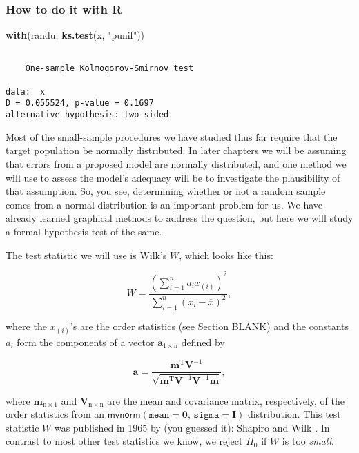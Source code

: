 \documentclass[]{book}
\newenvironment{Shaded}{\begin{snugshade}}{\end{snugshade}}
\newcommand{\KeywordTok}[1]{\textcolor[rgb]{0.13,0.29,0.53}{\textbf{{#1}}}}
\newcommand{\StringTok}[1]{\textcolor[rgb]{0.31,0.60,0.02}{{#1}}}
\newcommand{\NormalTok}[1]{{#1}}
\numberwithin{equation}{chapter}
\numberwithin{figure}{chapter}
\theoremstyle{plain}
\theoremstyle{definition}
\theoremstyle{remark}
\theoremstyle{definition}
\theoremstyle{definition}
\theoremstyle{remark}
\begin{document}
\subsubsection{How to do it with R}\label{how-to-do-it-with-r-43}

\begin{Shaded}
\begin{Highlighting}[]
\KeywordTok{with}\NormalTok{(randu, }\KeywordTok{ks.test}\NormalTok{(x, }\StringTok{"punif"}\NormalTok{))}
\end{Highlighting}
\end{Shaded}

\begin{verbatim}

    One-sample Kolmogorov-Smirnov test

data:  x
D = 0.055524, p-value = 0.1697
alternative hypothesis: two-sided
\end{verbatim}

Most of the small-sample procedures we have studied thus far require
that the target population be normally distributed. In later chapters we
will be assuming that errors from a proposed model are normally
distributed, and one method we will use to assess the model's adequacy
will be to investigate the plausibility of that assumption. So, you see,
determining whether or not a random sample comes from a normal
distribution is an important problem for us. We have already learned
graphical methods to address the question, but here we will study a
formal hypothesis test of the same.

The test statistic we will use is Wilk's \(W\), which looks like this:

\begin{equation}
W = \frac{\left(\sum_{i = 1}^{n} a_{i}x_{(i)} \right)^{2}}{\sum_{i = 1}^{n}(x_{i} - \overline{x})^{2}},
\end{equation}

where the \(x_{(i)}\)'s are the order statistics (see Section BLANK) and
the constants \(a_{i}\) form the components of a vector
\(\mathbf{a}_{1\times\mathrm{n}}\) defined by

\begin{equation}
\mathbf{a}=\frac{\mathbf{m}^{\mathrm{T}}\mathbf{V}^{-1}}{\sqrt{\mathbf{m}^{\mathrm{T}}\mathbf{V}^{-1}\mathbf{V}^{-1}\mathbf{m}}},
\end{equation}

where \(\mathbf{m}_{\mathrm{n}\times1}\) and
\(\mathbf{V}_{\mathrm{n} \times \mathrm{n}}\) are the mean and
covariance matrix, respectively, of the order statistics from an
\(\mathsf{mvnorm} \left(\mathtt{mean} = \mathbf{0},\,\mathtt{sigma} = \mathbf{I}\right)\)
distribution. This test statistic \(W\) was published in 1965 by (you
guessed it): Shapiro and Wilk \autocite{Wilk1965}. In contrast to most
other test statistics we know, we reject \(H_{0}\) if \(W\) is too
\emph{small}.
\end{document}
